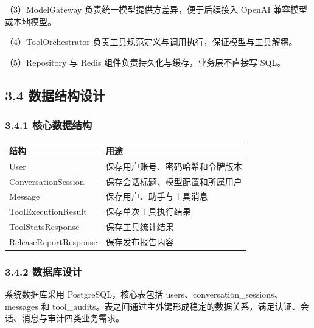 \documentclass[UTF8]{ctexart}
\begin{document}
（3）ModelGateway 负责统一模型提供方差异，便于后续接入 OpenAI
兼容模型或本地模型。

（4）ToolOrchestrator 负责工具规范定义与调用执行，保证模型与工具解耦。

（5）Repository 与 Redis 组件负责持久化与缓存，业务层不直接写 SQL。

\subsection{\texorpdfstring{\textbf{3.4
数据结构设计}}{3.4 数据结构设计}}\label{ux6570ux636eux7ed3ux6784ux8bbeux8ba1}

\subsubsection{\texorpdfstring{\textbf{3.4.1
核心数据结构}}{3.4.1 核心数据结构}}\label{ux6838ux5fc3ux6570ux636eux7ed3ux6784}

\begin{longtable}[]{@{}
  >{\raggedright\arraybackslash}p{}
  >{\raggedright\arraybackslash}p{}@{}}
\toprule\noalign{}
\begin{minipage}[b]{\linewidth}\raggedright
结构
\end{minipage} & \begin{minipage}[b]{\linewidth}\raggedright
用途
\end{minipage} \\
\midrule\noalign{}
\endhead
\bottomrule\noalign{}
\endlastfoot
User & 保存用户账号、密码哈希和令牌版本 \\
ConversationSession & 保存会话标题、模型配置和所属用户 \\
Message & 保存用户、助手与工具消息 \\
ToolExecutionResult & 保存单次工具执行结果 \\
ToolStatsResponse & 保存工具统计结果 \\
ReleaseReportResponse & 保存发布报告内容 \\
\end{longtable}

\subsubsection{\texorpdfstring{\textbf{3.4.2
数据库设计}}{3.4.2 数据库设计}}\label{ux6570ux636eux5e93ux8bbeux8ba1}

系统数据库采用 PostgreSQL，核心表包括
users、conversation\_sessions、messages 和
tool\_audits。表之间通过主外键形成稳定的数据关系，满足认证、会话、消息与审计四类业务需求。
\end{document}
